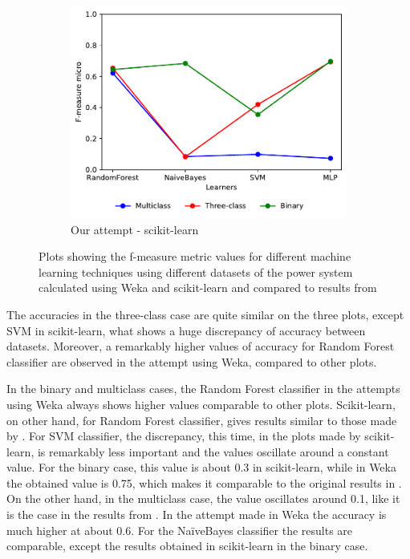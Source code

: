 \begin{figure}[H]
\begin{subfigure}[t]{110mm}
        \includegraphics[width=\linewidth, page = 3]{images/fmeasure}
        \caption{Our attempt - scikit-learn}
    \end{subfigure}  
    \caption{Plots showing the f-measure metric values for different machine learning techniques using different datasets of the power system calculated using Weka and scikit-learn and compared to results from \cite{borges_hink_machine_2014-1}}
    \label{fig:f1}
\end{figure}

The accuracies in the three-class case are quite similar on the three plots, except SVM in scikit-learn, what shows a huge discrepancy of accuracy between datasets. Moreover, a remarkably higher values of accuracy for Random Forest classifier are observed in the attempt using Weka, compared to other plots.

In the binary and multiclass cases, the Random Forest classifier in the attempts using Weka always shows higher values comparable to other plots. Scikit-learn, on other hand, for Random Forest classifier, gives results similar to those made by \cite{borges_hink_machine_2014-1}. For SVM classifier, the discrepancy, this time, in the plots made by scikit-learn, is remarkably less important and the values oscillate around a constant value. For the binary case, this value is about 0.3 in scikit-learn, while in Weka the obtained value is 0.75, which makes it comparable to the original results in \cite{borges_hink_machine_2014-1}. On the other hand, in the multiclass case, the value oscillates around 0.1, like it is the case in the results from \cite{borges_hink_machine_2014-1}. In the attempt made in Weka the accuracy is much higher at about 0.6. For the NaïveBayes classifier the results are comparable, except the results obtained in scikit-learn in the binary case.

